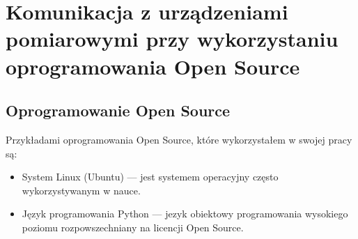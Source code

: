\chapter{Komunikacja z urządzeniami pomiarowymi przy wykorzystaniu oprogramowania Open Source}
\section{Oprogramowanie Open Source}
Przykładami oprogramowania Open Source, które wykorzystałem w swojej pracy są:
\begin{itemize}
\item System Linux (Ubuntu) --- jest systemem operacyjny często wykorzystywanym w nauce.
\item Język programowania Python --- jezyk obiektowy programowania wysokiego poziomu rozpowszechniany na licencji Open Source.
\end{itemize}
